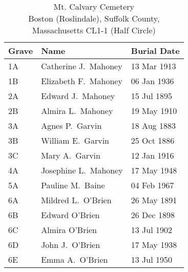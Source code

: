 \begin{table}[ht]
	\centering
	\caption{Mt. Calvary Cemetery\cite{John3OBrienBurial} \\
		Boston (Roslindale), Suffolk County, Massachusetts
		CL1-1 (Half Circle)}
	\begin{tabular}{|l|l|l|}
		\hline
		\textbf{Grave} & \textbf{Name} & \textbf{Burial Date} \\
		\hline
		1A & Catherine J.\ Mahoney\index{Kenney!Catherine Josephine}\index{Mahoney/Mahony!Catherine Josephine (Kenney)} & 13 Mar 1913 \\
		\hline
		1B & Elizabeth F.\ Mahoney\index{Mahoney/Mahony!Elizabeth F.} & 06 Jan 1936 \\
		\hline
		2A & Edward J.\ Mahoney\index{Mahoney/Mahony!Edward} & 15 Jul 1895 \\
		\hline
		2B & Almira L.\ Mahoney\index{Mahoney/Mahony!Almira L.} & 19 May 1910 \\
		\hline
		3A & Agnes P.\ Garvin\index{Garvin!Agnes P.} & 18 Aug 1883 \\
		\hline
		3B & William E.\ Garvin\index{Garvin!William E.} & 25 Oct 1886 \\
		\hline
		3C & Mary A.\ Garvin\index{Garvin!Mary A.} & 12 Jan 1916 \\
		\hline
		4A & Josephine L.\ Mahoney\index{Mahoney/Mahony!Josephine L.} & 17 May 1948 \\
		\hline
		5A & Pauline M.\ Baine\index{O'Brien!Pauline M.\textsuperscript{4}}\index{Baine!Pauline M.\textsuperscript{4} (O'Brien)} & 04 Feb 1967 \\
		\hline
		6A & Mildred L.\ O'Brien\index{O'Brien!Mildred Louise\textsuperscript{4}}\index{French!Mildred Louise\textsuperscript{4} (O'Brien)} & 26 May 1891 \\
		\hline
		6B & Edward O'Brien\index{O'Brien!Edward\textsuperscript{4} (1898--1898)} & 26 Dec 1898 \\
		\hline
		6C & Almira O'Brien\index{O'Brien!Almyra Louise\textsuperscript{4}} & 13 Jul 1902 \\
		\hline
		6D & John J.\ O'Brien\index{O'Brien!John Joseph\textsuperscript{3} (1861--1938)} & 17 May 1938 \\
		\hline
		6E & Emma A.\ O'Brien\index{Mahoney/Mahony!Emma}\index{O'Brien!Emma (Mahony)} & 13 Jul 1950 \\
		\hline
	\end{tabular}
\end{table}

